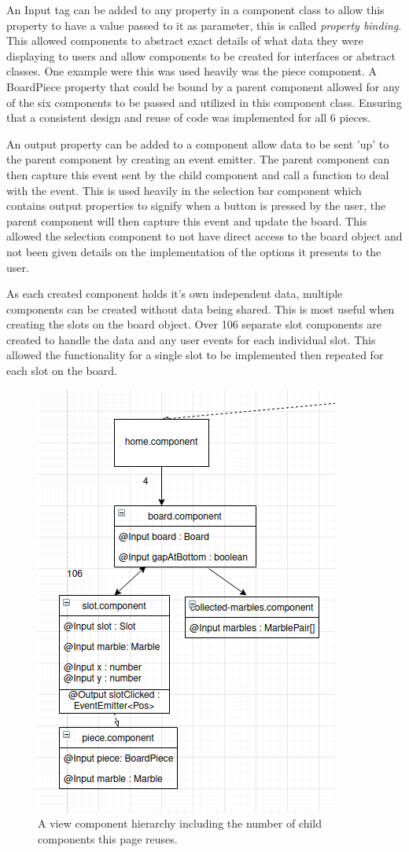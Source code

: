 \documentclass{l4proj}
\begin{document}
An Input tag can be added to any property in a component class to allow this property to have a value passed to it as parameter, this is called \emph{property binding}. This allowed components to abstract exact details of what data they were displaying to users and allow components to be created for interfaces or abstract classes. One example were this was used heavily was the piece component. A BoardPiece property that could be bound by a parent component allowed for any of the six components to be passed and utilized in this component class. Ensuring that a consistent design and reuse of code was implemented for all 6 pieces. 

An output property can be added to a component allow data to be sent 'up' to the parent component by creating an event emitter. The parent component can then capture this event sent by the child component and call a function to deal with the event. This is used heavily in the selection bar component which contains output properties to signify when a button is pressed by the user, the parent component will then capture this event and update the board. This allowed the selection component to not have direct access to the board object and not been given details on the implementation of the options it presents to the user. 

As each created component holds it's own independent data, multiple components can be created without data being shared. This is most useful when creating the slots on the board object. Over 106 separate slot components are created to handle the data and any user events for each individual slot. This allowed the functionality for a single slot to be implemented then repeated for each slot on the board.

\begin{figure}
    \centering
    \includegraphics[width=0.45\linewidth]{images/homeComponent.png}
    \caption{A view component hierarchy including the number of child components this page reuses.}
    \label{fig:homeComponent}
\end{figure}
\end{document}
